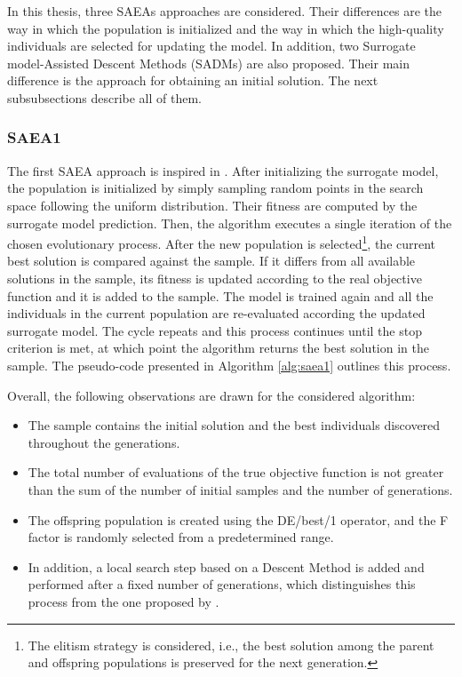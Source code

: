 			In this thesis, three SAEAs approaches are considered. Their differences are the way in which the population is initialized and the way in which the high-quality individuals are selected for updating the model. In addition, two Surrogate model-Assisted Descent Methods (SADMs) are also proposed. Their main difference is the approach for obtaining an initial solution. The next subsubsections describe all of them.
		
			\subsubsection{SAEA1}\label{chap:proposed-methodology:surrogate:algorithms:saea1}
			
				The first SAEA approach is inspired in \citep{salucci2022learned}. After initializing the surrogate model, the population is initialized by simply sampling random points in the search space following the uniform distribution. Their fitness are computed by the surrogate model prediction. Then, the algorithm executes a single iteration of the chosen evolutionary process. After the new population is selected\footnote{The elitism strategy is considered, i.e., the best solution among the parent and offspring populations is preserved for the next generation.}, the current best solution is compared against the sample. If it differs from all available solutions in the sample, its fitness is updated according to the real objective function and it is added to the sample. The model is trained again and all the individuals in the current population are re-evaluated according the updated surrogate model. The cycle repeats and this process continues until the stop criterion is met, at which point the algorithm returns the best solution in the sample. The pseudo-code presented in Algorithm \ref{alg:saea1} outlines this process.
				
				Overall, the following observations are drawn for the considered algorithm:
				\begin{itemize}
					\item The sample contains the initial solution and the best individuals discovered throughout the generations.
					\item The total number of evaluations of the true objective function is not greater than the sum of the number of initial samples and the number of generations.
					\item The offspring population is created using the DE/best/1 operator, and the F factor is randomly selected from a predetermined range.
					\item In addition, a local search step based on a Descent Method is added and performed after a fixed number of generations, which distinguishes this process from the one proposed by \cite{salucci2022learned}.
				\end{itemize}
				
